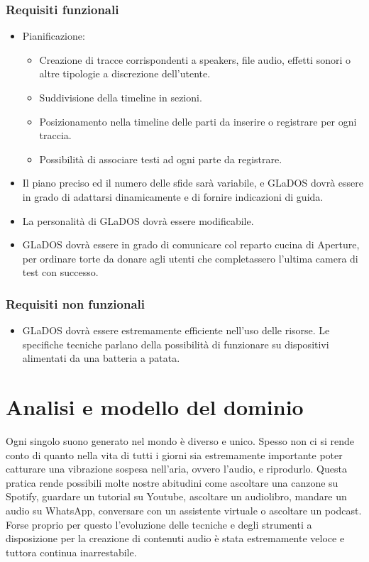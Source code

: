 \documentclass[a4paper,12pt]{report}
\begin{document}
\subsubsection{Requisiti funzionali}
\begin{itemize}
	\item Pianificazione:
	\begin{itemize}
	    \item Creazione di tracce corrispondenti a speakers, file audio, effetti sonori o altre tipologie a discrezione dell’utente.
	    \item Suddivisione della timeline in sezioni.
	    \item Posizionamento nella timeline delle parti da inserire o registrare per ogni traccia.
	    \item Possibilità di associare testi ad ogni parte da registrare.
	\end{itemize}
	\item Il piano preciso ed il numero delle sfide sarà variabile, e GLaDOS dovrà essere in grado di adattarsi dinamicamente e di fornire indicazioni di guida.
	\item La personalità di GLaDOS dovrà essere modificabile.
	\item GLaDOS dovrà essere in grado di comunicare col reparto cucina di Aperture, per ordinare torte da donare agli utenti che completassero l'ultima camera di test con successo.
\end{itemize}

\subsubsection{Requisiti non funzionali}
\begin{itemize}
	\item GLaDOS dovrà essere estremamente efficiente nell'uso delle risorse. Le specifiche tecniche parlano della possibilità di funzionare su dispositivi alimentati da una batteria a patata.
\end{itemize}

\section{Analisi e modello del dominio}
Ogni singolo suono generato nel mondo è diverso e unico. Spesso non ci si rende conto di quanto nella vita di tutti i giorni sia estremamente importante poter catturare una vibrazione sospesa nell’aria, ovvero l’audio, e riprodurlo. Questa pratica rende possibili molte nostre abitudini come ascoltare una canzone su Spotify, guardare un tutorial su Youtube, ascoltare un audiolibro, mandare un audio su WhatsApp, conversare con un assistente virtuale o ascoltare un podcast.
Forse proprio per questo l’evoluzione delle tecniche e degli strumenti a disposizione per la creazione di contenuti audio è stata estremamente veloce e tuttora continua inarrestabile.
\end{document}
